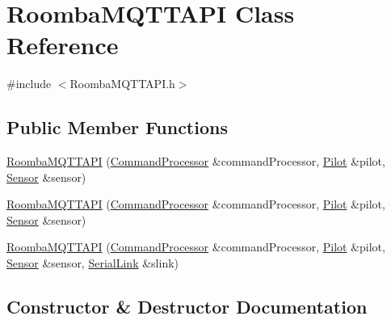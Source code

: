 \hypertarget{class_roomba_m_q_t_t_a_p_i}{}\section{Roomba\+M\+Q\+T\+T\+A\+PI Class Reference}
\label{class_roomba_m_q_t_t_a_p_i}


{\ttfamily \#include $<$Roomba\+M\+Q\+T\+T\+A\+P\+I.\+h$>$}

\subsection*{Public Member Functions}
\begin{DoxyCompactItemize}
\item 
\hyperlink{class_roomba_m_q_t_t_a_p_i_a519947fd8f0f94792006e2d24cb12016}{Roomba\+M\+Q\+T\+T\+A\+PI} (\hyperlink{class_command_processor}{Command\+Processor} \&command\+Processor, \hyperlink{class_pilot}{Pilot} \&pilot, \hyperlink{class_sensor}{Sensor} \&sensor)
\item 
\hyperlink{class_roomba_m_q_t_t_a_p_i_a519947fd8f0f94792006e2d24cb12016}{Roomba\+M\+Q\+T\+T\+A\+PI} (\hyperlink{class_command_processor}{Command\+Processor} \&command\+Processor, \hyperlink{class_pilot}{Pilot} \&pilot, \hyperlink{class_sensor}{Sensor} \&sensor)
\item 
\hyperlink{class_roomba_m_q_t_t_a_p_i_a7e4b4c6f8698095a1ad9fbd450a6ee50}{Roomba\+M\+Q\+T\+T\+A\+PI} (\hyperlink{class_command_processor}{Command\+Processor} \&command\+Processor, \hyperlink{class_pilot}{Pilot} \&pilot, \hyperlink{class_sensor}{Sensor} \&sensor, \hyperlink{class_serial_link}{Serial\+Link} \&slink)
\end{DoxyCompactItemize}


\subsection{Constructor \& Destructor Documentation}

